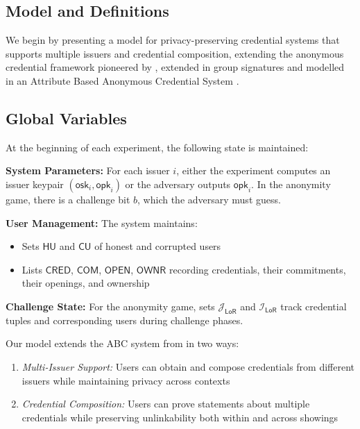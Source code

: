 \subsection{Model and Definitions}
We begin by presenting a model for privacy-preserving credential systems that supports multiple issuers and credential composition, extending the anonymous credential framework pioneered by \cite{hutchison_signature_2004}, extended in group signatures \cite{hutchison_foundations_2005} and modelled in an Attribute Based Anonymous Credential System \cite{fuchsbauer_structure-preserving_2019}.

\subsection{Global Variables}
At the beginning of each experiment, the following state is maintained:

\noindent \textbf{System Parameters:} For each issuer $i$, either the experiment computes an issuer keypair $(\mathsf{osk}_i, \mathsf{opk}_i)$ or the adversary outputs $\mathsf{opk}_i$. In the anonymity game, there is a challenge bit $b$, which the adversary must guess.

\noindent \textbf{User Management:} The system maintains:
\begin{itemize}
\item Sets $\mathsf{HU}$ and $\mathsf{CU}$ of honest and corrupted users
\item Lists $\mathsf{CRED}$, $\mathsf{COM}$, $\mathsf{OPEN}$, $\mathsf{OWNR}$ recording credentials, their commitments, their openings, and ownership
\end{itemize}

\noindent \textbf{Challenge State:} For the anonymity game, sets $\mathcal{J}_{\mathsf{LoR}}$ and $\mathcal{I}_{\mathsf{LoR}}$ track credential tuples and corresponding users during challenge phases.

\noindent  Our model extends the ABC system from \cite{fuchsbauer_structure-preserving_2019} in two ways:
\begin{enumerate}
    \item \textit{Multi-Issuer Support:} Users can obtain and compose credentials from different issuers while maintaining privacy across contexts
    \item \textit{Credential Composition:} Users can prove statements about multiple credentials while preserving unlinkability both within and across showings
\end{enumerate}



